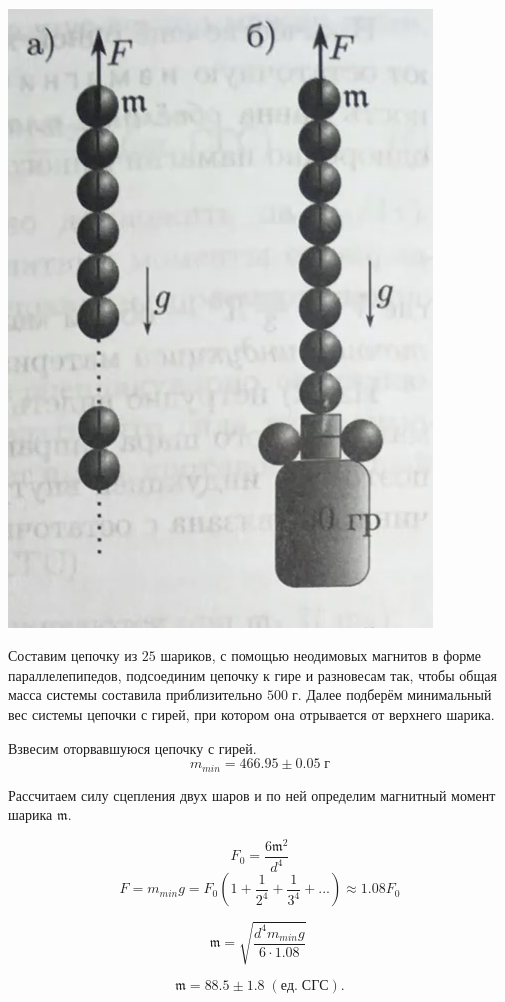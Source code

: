 \documentclass[a4paper,12pt]{article}
\begin{document}
\begin{center}
\begin{minipage}{0.4\textwidth}
\end{minipage}
\begin{minipage}{0.05\textwidth}
\
\end{minipage}
\begin{minipage}{0.4\textwidth}
\begin{center}
\includegraphics[width=0.7\linewidth]{2.jpg}\\
\end{center}
Составим цепочку из $25$ шариков, с помощью неодимовых магнитов в форме параллелепипедов, подсоединим цепочку к гире и разновесам так, чтобы общая масса системы составила приблизительно $500 \;г$. Далее подберём минимальный вес системы цепочки с гирей, при котором она отрывается от верхнего шарика.

Взвесим оторвавшуюся цепочку с гирей. $$m_{min} = 466.95 \pm 0.05 \; г$$

Рассчитаем силу сцепления двух шаров и по ней определим магнитный момент шарика $\mathfrak{m}$.

\[ F_0 = \frac{6\mathfrak{m}^2}{d^4} \] \[F = m_{min}g  = F_0(1+\frac1{2^4}+\frac1{3^4} +...)\approx 1.08 F_0 \]

\[ \mathfrak{m} = \sqrt{\frac{d^4m_{min}g}{6 \cdot 1.08}} \;\]

\[\mathfrak{m} = 88.5 \pm 1.8 \; (ед. \; СГС).\]
\end{minipage}
\end{center}
\end{document}

